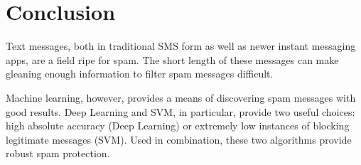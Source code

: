 \documentclass[10pt,journal,compsoc]{IEEEtran}
\begin{document}
%



\section{Conclusion}

Text messages, both in traditional SMS form as well as newer instant messaging apps, are a field ripe for spam. The short length of these messages can make gleaning enough information to filter spam messages difficult.

Machine learning, however, provides a means of discovering spam messages with good results. Deep Learning and SVM, in particular, provide two useful choices: high absolute accuracy (Deep Learning) or extremely low instances of blocking legitimate messages (SVM). Used in combination, these two algorithms provide robust spam protection.
\end{document}
